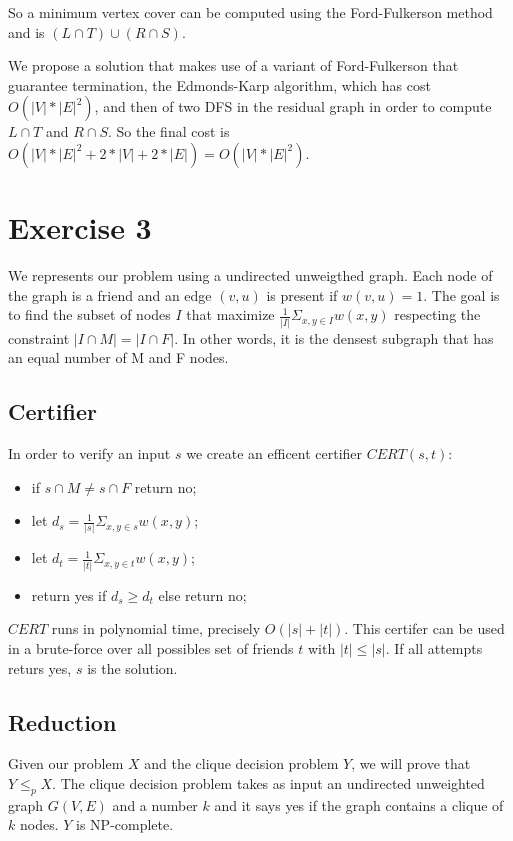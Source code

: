 \documentclass[paper=a4, fontsize=11pt]{scrartcl} %
\numberwithin{equation}{section} %
\numberwithin{figure}{section} %
\numberwithin{table}{section} %
\begin{document}
So a minimum vertex cover can be computed using the Ford-Fulkerson method and is $(L \cap T) \cup (R \cap S)$.

We propose a solution that makes use of a variant of Ford-Fulkerson that guarantee termination, the Edmonds-Karp algorithm, which has cost $O(|V|*|E|^2)$, and then of two DFS in the residual graph in order to compute $L \cap T$ and $R \cap S$.
So the final cost is $O(|V|*|E|^2+2*|V|+2*|E|) = O(|V|*|E|^2)$.

\bigskip
\section*{Exercise 3}

We represents our problem using a undirected unweigthed graph. Each node of the graph is a friend and an edge $(v,u)$ is present if $w(v,u) = 1$.
The goal is to find the subset of nodes $I$ that maximize $\frac{1}{|I|} \Sigma_{x,y \in I} w(x, y)$ respecting the constraint $|I \cap M| = |I \cap F|$.
In other words, it is the densest subgraph that has an equal number of M and F nodes.

\subsection*{Certifier}

In order to verify an input $s$ we create an efficent certifier $CERT(s, t)$:

\begin{itemize}
    \item if $s \cap M \neq s \cap F$ return no;
    \item let $d_s = \frac{1}{|s|} \Sigma_{x,y \in s} w(x, y)$;
    \item let $d_t = \frac{1}{|t|} \Sigma_{x,y \in t} w(x, y)$;
    \item return yes if $d_s \geq d_t$ else return no;
\end{itemize}

$CERT$ runs in polynomial time, precisely $O(|s|+|t|)$. This certifer can be used in a brute-force over all possibles set of friends $t$ with $|t| \leq |s|$. If all attempts returs yes, $s$ is the solution.

\subsection*{Reduction}

Given our problem $X$ and the clique decision problem $Y$, we will prove that $Y \leq_p X$.
The clique decision problem takes as input an undirected unweighted graph $G(V, E)$ and a number $k$ and it says yes if the graph contains a clique of $k$ nodes.
$Y$ is NP-complete.
\end{document}
